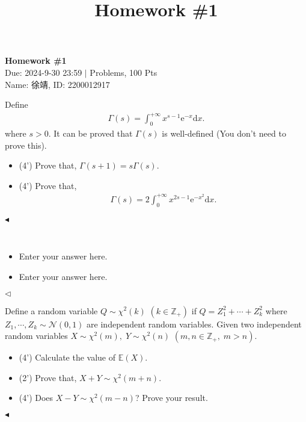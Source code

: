 \documentclass[11pt]{article}
\title{Homework \#1}
\newenvironment{problem}[2][Problem]{\begin{trivlist}
\item[\hskip \labelsep {\bfseries #1}\hskip \labelsep {\bfseries #2.}]}{\hfill$\blacktriangleleft$\end{trivlist}}
\newenvironment{answer}[1][Answer]{\begin{trivlist}
\item[\hskip \labelsep {\bfseries #1.}\hskip \labelsep]}{\hfill$\lhd$\end{trivlist}}
\begin{document}
\pagestyle{fancy}
\chead{}

\begin{center}
    {\LARGE \bf Homework \#1}\\
    {Due: 2024-9-30 23:59 \quad$|$ Problems, 100 Pts}\\
    {Name: 徐靖, ID: 2200012917}            %
\end{center}



\begin{problem}{1 (8')}
Define
\begin{align*}
    \Gamma(s) = \int_{0}^{+\infty} x^{s - 1} \mathrm{e}^{-x} \mathrm{d}x.
\end{align*}
where $s>0$. It can be proved that $\Gamma(s)$ is well-defined (You don't need to prove this).
\begin{itemize}
    \item [(1)] (4') Prove that, $\Gamma(s+1)=s\Gamma(s)$.
    \item [(2)] (4') Prove that,
    \begin{align*}
        \Gamma(s)=2\int_{0}^{+\infty}x^{2s-1}\mathrm{e}^{-x^2}\mathrm{d}x.
    \end{align*}
\end{itemize}
\end{problem}

\begin{answer} ~
\begin{itemize}
    \item [(1)] Enter your answer here.
    \item [(2)] Enter your answer here.
\end{itemize}
\end{answer}



\begin{problem}{2 (10')}
Define a random variable $Q \sim \chi^2(k)$ $(k\in\mathbb{Z}_+)$ if $Q=Z_1^2+\cdots+Z_k^2$ where $Z_1,\cdots,Z_k \sim \mathcal{N}(0,1)$ are independent random variables. Given two independent random variables $X\sim\chi^2(m),\;Y\sim\chi^2(n)$ $(m,n\in\mathbb{Z}_+,\;m > n)$.
\begin{itemize}
    \item [(1)] (4') Calculate the value of $\mathbb{E}(X)$.
    \item [(2)] (2') Prove that, $X + Y \sim \chi^2(m + n)$.
    \item [(3)] (4') Does $X - Y \sim \chi^2(m - n)$? Prove your result.
\end{itemize}
\end{problem}
\end{document}

